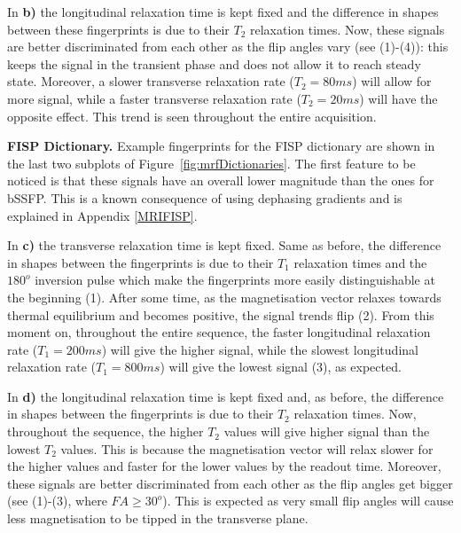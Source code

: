 \hfill

In \textbf{b)} the longitudinal relaxation time is kept fixed and the difference in shapes between these fingerprints is due to their $T_2$ relaxation times.
Now, these signals are better discriminated from each other as the flip angles vary (see (1)-(4)): this keeps the signal in the transient phase and does not allow it to reach steady state.
Moreover, a slower transverse relaxation rate ($T_2 = 80ms$) will allow for more signal, while a faster transverse relaxation rate ($T_2 = 20ms$) will have the opposite effect.
This trend is seen throughout the entire acquisition.

\hfill

\textbf{FISP Dictionary.} 
Example fingerprints for the FISP dictionary are shown in the last two subplots of Figure~\ref{fig:mrfDictionaries}.
The first feature to be noticed is that these signals have an overall lower magnitude than the ones for bSSFP.
This is a known consequence of using dephasing gradients and is explained in Appendix \ref{MRIFISP}.

\hfill

In \textbf{c)} the transverse relaxation time is kept fixed. 
Same as before, the difference in shapes between the fingerprints is due to their $T_1$ relaxation times and the $180^o$ inversion pulse which make the fingerprints more easily distinguishable at the beginning (1).
After some time, as the magnetisation vector relaxes towards thermal equilibrium and becomes positive, the signal trends flip (2).
From this moment on, throughout the entire sequence, the faster longitudinal relaxation rate ($T_1 = 200ms$) will give the higher signal, while the slowest longitudinal relaxation rate ($T_1 = 800ms$) will give the lowest signal (3), as expected.

\hfill

In \textbf{d)} the longitudinal relaxation time is kept fixed and, as before, the difference in shapes between the fingerprints is due to their $T_2$ relaxation times.
Now, throughout the sequence, the higher $T_2$ values will give higher signal than the lowest $T_2$ values.
This is because the magnetisation vector will relax slower for the higher values and faster for the lower values by the readout time.
Moreover, these signals are better discriminated from each other as the flip angles get bigger (see (1)-(3), where $FA \geq 30^o$).
This is expected as very small flip angles will cause less magnetisation to be tipped in the transverse plane.

